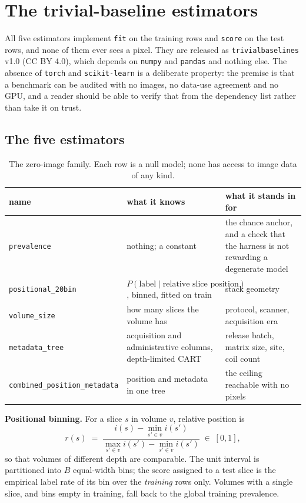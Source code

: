\documentclass[11pt,a4paper]{article}
\begin{document}
\clearpage
\section{The trivial-baseline estimators}

All five estimators implement \texttt{fit} on the training rows and \texttt{score} on
the test rows, and none of them ever sees a pixel. They are released as
\texttt{trivialbaselines} v1.0 (CC BY 4.0), which depends on \texttt{numpy} and
\texttt{pandas} and nothing else. The absence of \texttt{torch} and
\texttt{scikit-learn} is a deliberate property: the premise is that a benchmark can be
audited with no images, no data-use agreement and no GPU, and a reader should be able
to verify that from the dependency list rather than take it on trust.

\subsection{The five estimators}

\begin{table}[htbp]
\centering
\caption{The zero-image family. Each row is a null model; none has access to image
data of any kind.}
\footnotesize
\begin{tabular}{@{}L{4.7cm}L{4.9cm}L{4.9cm}@{}}
\toprule
name & what it knows & what it stands in for \\
\midrule
\texttt{prevalence} & nothing; a constant & the chance anchor, and a check that the harness is not rewarding a degenerate model \\
\texttt{positional\_20bin} & $P(\text{label} \mid \text{relative slice position})$, binned, fitted on train & stack geometry \\
\texttt{volume\_size} & how many slices the volume has & protocol, scanner, acquisition era \\
\texttt{metadata\_tree} & acquisition and administrative columns, depth-limited CART & release batch, matrix size, site, coil count \\
\texttt{combined\_position\_metadata} & position and metadata in one tree & the ceiling reachable with no pixels \\
\bottomrule
\end{tabular}
\end{table}

\textbf{Positional binning.} For a slice $s$ in volume $v$, relative position is
\begin{equation}
r(s) \;=\; \frac{i(s) - \min_{s' \in v} i(s')}{\max_{s' \in v} i(s') - \min_{s' \in v} i(s')} \;\in\; [0,1],
\end{equation}
so that volumes of different depth are comparable. The unit interval is partitioned
into $B$ equal-width bins; the score assigned to a test slice is the empirical label
rate of its bin over the \emph{training} rows only. Volumes with a single slice, and
bins empty in training, fall back to the global training prevalence.
\end{document}
